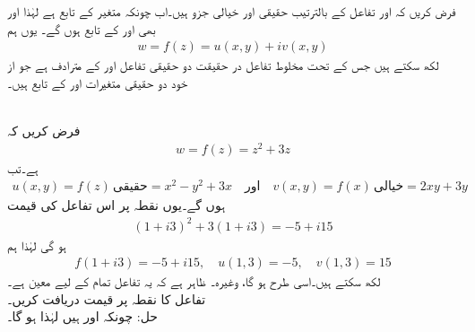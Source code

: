 فرض کریں کہ  اور  تفاعل  کے بالترتیب حقیقی اور خیالی جزو ہیں۔اب چونکہ  متغیر  کے تابع ہے لہٰذا   اور  بھی  اور  کے تابع ہوں گے۔ یوں ہم
\begin{align*}
w=f(z)=u(x,y)+iv(x,y)
\end{align*}
لکھ سکتے ہیں جس کے تحت مخلوط تفاعل  در حقیقت دو حقیقی تفاعل  اور  کے مترادف ہے جو  از خود دو حقیقی متغیرات  اور  کے تابع ہیں۔

\quad {}\\
فرض کریں کہ
\begin{align*}
w=f(z)=z^2+3z
\end{align*}
ہے۔تب 
\begin{align*}
u(x,y)=f(z)\,\text{حقیقی}=x^2-y^2+3x\quad \text{اور}\quad v(x,y)=f(x)\,\text{خیالی}=2xy+3y
\end{align*}
ہوں گے۔یوں نقطہ  پر اس تفاعل کی قیمت
\begin{align*}
(1+i3)^2+3(1+i3)=-5+i15
\end{align*}
ہو گی لہٰذا ہم
\begin{align*}
f(1+i3)=-5+i15,\quad u(1,3)=-5,\quad v(1,3)=15
\end{align*}
لکھ سکتے ہیں۔اسی طرح  ہو گا، وغیرہ۔ ظاہر ہے کہ یہ تفاعل تمام  کے لیے معین ہے۔
\quad {}\\
تفاعل   کا نقطہ  پر قیمت دریافت کریں۔\\
حل:\quad
چونکہ  اور  ہیں لہٰذا  ہو گا۔

